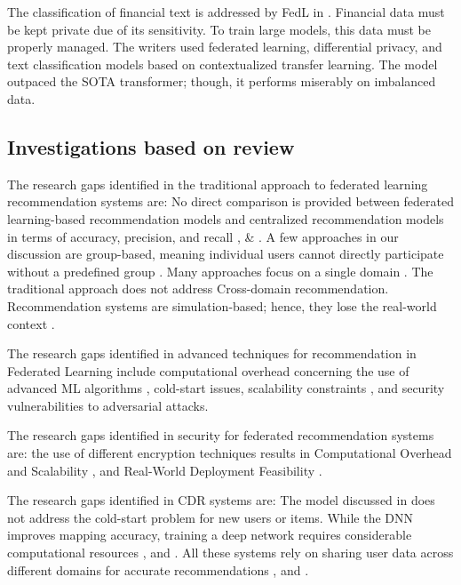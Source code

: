 The classification of financial text is addressed by FedL in \cite{ref75}. Financial data must be kept private due of its sensitivity. To train large models, this data must be properly managed. The writers used federated learning, differential privacy, and text classification models based on contextualized transfer learning. The model outpaced the SOTA transformer; though, it performs miserably on imbalanced data.

\subsection{Investigations based on review}
The research gaps identified in the traditional approach to federated learning recommendation systems are:  No direct comparison is provided between federated learning-based recommendation models and centralized recommendation models in terms of accuracy, precision, and recall \cite{ref21}, \cite{ref22} \& \cite{ref24}. A few approaches in our discussion are group-based, meaning individual users cannot directly participate without a predefined group  \cite{ref23} \cite{ref25}. Many approaches focus on a single domain \cite{ref22} \cite{ref26} \cite{ref12} \cite{ref27}. The traditional approach does not address Cross-domain recommendation. Recommendation systems are simulation-based; hence, they lose the real-world context \cite{ref27} .

The research gaps identified in advanced techniques for recommendation in Federated Learning include computational overhead concerning the use of advanced ML algorithms \cite{ref30}\cite{ref31}, cold-start issues, scalability constraints\cite{ref32} , and security vulnerabilities to adversarial attacks\cite{ref9}.

The research gaps identified in security for federated recommendation systems are: the use of different encryption techniques results in Computational Overhead and Scalability \cite{ref29}\cite{ref33}\cite{ref36}, and Real-World Deployment Feasibility \cite{ref37}.

The research gaps identified in CDR systems are: The model discussed in \cite{ref39} does not address the cold-start problem for new users or items. While the DNN improves mapping accuracy, training a deep network requires considerable computational resources \cite{ref39}, \cite{ref40}  and \cite{ref41}. All these systems rely on sharing user data across different domains for accurate recommendations \cite{ref39} \cite{ref40}, \cite{ref41} and \cite{ref42}.

